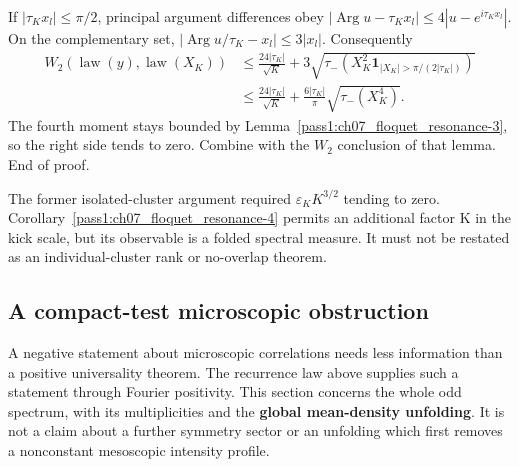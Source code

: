 If \(|\tau_Kx_l|\leq\pi/2\), principal argument differences obey \(|\operatorname{Arg}u-\tau_Kx_l|\leq4|u-e^{i\tau_Kx_l}|\). On the complementary set, \(|\operatorname{Arg}u/\tau_K-x_l|\leq3|x_l|\). Consequently \[
 \begin{split}
 W_2(\operatorname{law}(y),\operatorname{law}(X_K))
 &\leq\frac{24|\tau_K|}{\sqrt K}
   +3\sqrt{\tau_-\!\left(X_K^2
       \mathbf1_{|X_K|>\pi/(2|\tau_K|)}\right)}\\
 &\leq\frac{24|\tau_K|}{\sqrt K}
       +\frac{6|\tau_K|}{\pi}\sqrt{\tau_-(X_K^4)}.
 \end{split}\tag{FN.22}
\] The fourth moment stays bounded by Lemma~\ref{pass1:ch07_floquet_resonance-3}, so the right side tends to zero. Combine with the \(W_{2}\) conclusion of that lemma. End of proof.

The former isolated-cluster argument required \(\varepsilon_KK^{3/2}\) tending to zero. Corollary~\ref{pass1:ch07_floquet_resonance-4} permits an additional factor K in the kick scale, but its observable is a folded spectral measure. It must not be restated as an individual-cluster rank or no-overlap theorem.

\subsection{A compact-test microscopic obstruction}\label{floquet:a-compact-test-microscopic-obstruction}

A negative statement about microscopic correlations needs less information than a positive universality theorem. The recurrence law above supplies such a statement through Fourier positivity. This section concerns the whole odd spectrum, with its multiplicities and the \textbf{global mean-density unfolding}. It is not a claim about a further symmetry sector or an unfolding which first removes a nonconstant mesoscopic intensity profile.

